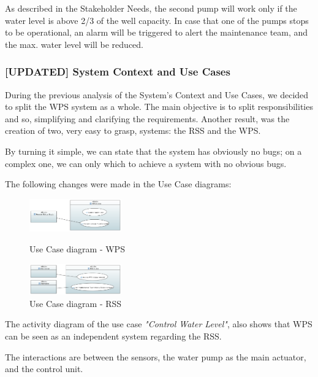 \documentclass[11pt]{article}
\begin{document}
As described in the Stakeholder Needs, the second pump will work only if the water level is above 2/3 of the well capacity. In case that one of the pumps stops to be operational, an alarm will be triggered to alert the maintenance team, and the max. water level will be reduced.

\subsubsection{[UPDATED] System Context and Use Cases}

During the previous analysis of the System's Context and Use Cases, we decided to split the WPS system as a whole. The main objective is to split responsibilities and so, simplifying and clarifying the requirements. Another result, was the creation of two, very easy to grasp, systems: the RSS and the WPS. 

By turning it simple, we can state that the system has obviously no bugs; on a complex one, we can only which to achieve a system with no obvious bugs.

The following changes were made in the Use Case diagrams:

\begin{figure}[H]
\centering
\begin{minipage}{.5\linewidth}
  \centering
  \includegraphics[width=150px]{../diagrams/use-case-wps.png}
  \caption{Use Case diagram - WPS}
  \label{fig:Use Case WPS}
\end{minipage}%
\begin{minipage}{.5\linewidth}
  \centering
  \includegraphics[width=150px]{../diagrams/use-case-rss.png}
  \caption{Use Case diagram - RSS}
  \label{fig:Use Case RSS}
\end{minipage}
\end{figure}

The activity diagram of the use case \textit{"Control Water Level"}, also shows that WPS can be seen as an independent system regarding the RSS.

The interactions are between the sensors, the water pump as the main actuator, and the control unit.
\end{document}
